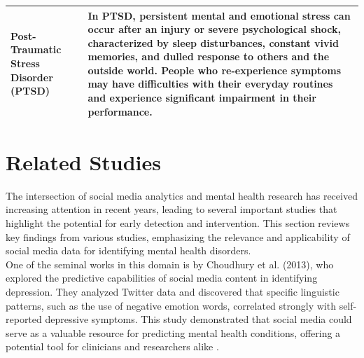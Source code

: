 \begin{center}
\begin{tabular}{|p{4cm}|p{10cm}|}
  \hline
  Post-Traumatic Stress Disorder (PTSD) & In PTSD, persistent mental and emotional stress can occur after an injury or severe psychological shock, characterized by sleep disturbances, constant vivid memories, and dulled response to others and the outside world. People who re-experience symptoms may have difficulties with their everyday routines and experience significant impairment in their performance. \\
  \hline 
\end{tabular}

  
\end{center}






\section{Related Studies}

\noindent
The intersection of social media analytics and mental health research has received increasing attention in recent years, leading to several important studies that highlight the potential for early detection and intervention. This section reviews key findings from various studies, emphasizing the relevance and applicability of social media data for identifying mental health disorders. \\

\noindent
One of the seminal works in this domain is by Choudhury et al. (2013), who explored the predictive capabilities of social media content in identifying depression. They analyzed Twitter data and discovered that specific linguistic patterns, such as the use of negative emotion words, correlated strongly with self-reported depressive symptoms. This study demonstrated that social media could serve as a valuable resource for predicting mental health conditions, offering a potential tool for clinicians and researchers alike \cite{Choudhury2013PredictingDV}. \\

